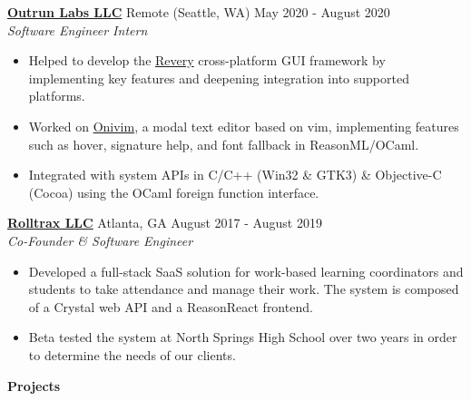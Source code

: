 \documentclass{article}
\newcommand{\sectionHeader}[1]{{\large \textbf{#1}}\hspace{5pt}\xrfill[.6ex]{.4pt}}
\newcommand{\sectionSpacer}{\vspace{6pt}}
\begin{document}
  \vspace{3pt}

  \href{https://www.outrunlabs.com/}{\textbf{Outrun Labs LLC}} \hspace{3pt} {\footnotesize {}} Remote (Seattle, WA) \hspace*{\fill} {\footnotesize {}} \hspace{1pt} May 2020 - August 2020\\
  {\footnotesize {}} \hspace{1pt} \textit{Software Engineer Intern} 
  \begin{itemize}
    \item Helped to develop the \href{https://github.com/revery-ui/revery}{Revery} cross-platform GUI framework by implementing key features and deepening integration into supported platforms.
    \item Worked on \href{https://onivim.io/}{Onivim}, a modal text editor based on vim, implementing features such as hover, signature help, and font fallback in ReasonML/OCaml.
    \item Integrated with system APIs in C/C++ (Win32 \& GTK3) \& Objective-C (Cocoa) using the OCaml foreign function interface.
  \end{itemize}

  \href{https://rolltrax.com}{\textbf{Rolltrax LLC}} \hspace{3pt} {\footnotesize {}} Atlanta, GA \hspace*{\fill} {\footnotesize {}} \hspace{1pt} August 2017 - August 2019\\
  {\footnotesize {}} \hspace{1pt} \textit{Co-Founder \& Software Engineer}
  \begin{itemize}
    \item Developed a full-stack SaaS solution for work-based learning coordinators and students to take attendance and manage their work. The system is composed of a Crystal web API and a ReasonReact frontend.
    \item Beta tested the system at North Springs High School over two years in order to determine the needs of our clients.
  \end{itemize}

  \sectionSpacer

  \sectionHeader{Projects}

  \vspace{3pt}
\end{document}
